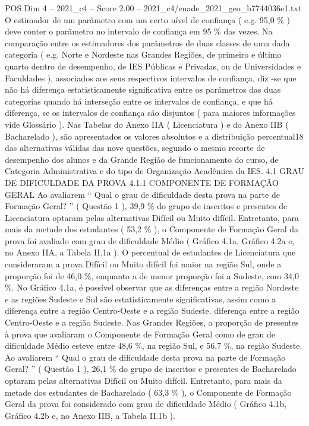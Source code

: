 \begin{textsample}{POS Dim 4 – 2021\_c4 – Score 2.00 – 2021\_c4/enade\_2021\_geo\_b7744036e1.txt}
O estimador de um parâmetro com um certo nível de confiança ( e.g. 95,0 \% ) deve conter o parâmetro no intervalo de confiança em 95 \% das vezes.
Na comparação entre os estimadores dos parâmetros de duas classes de uma dada categoria ( e.g.
Norte e Nordeste nas Grandes Regiões, de primeiro e último quarto dentro de desempenho, de IES Públicas e Privadas, ou de Universidades e Faculdades ), associados aos seus respectivos intervalos de confiança, diz -se que não há diferença estatisticamente significativa entre os parâmetros das duas categorias quando há interseção entre os intervalos de confiança, e que há diferença, se os intervalos de confiança são disjuntos ( para maiores informações vide Glossário ).
Nas Tabelas do Anexo IIA ( Licenciatura ) e do Anexo IIB ( Bacharelado ), são apresentados os valores absolutos e a distribuição percentual18 das alternativas válidas das nove questões, segundo o mesmo recorte de desempenho dos alunos e da Grande Região de funcionamento do curso, de Categoria Administrativa e do tipo de Organização Acadêmica da IES. 4.1 GRAU DE DIFICULDADE DA PROVA 4.1.1 COMPONENTE DE FORMAÇÃO GERAL Ao avaliarem “ Qual o grau de dificuldade desta prova na parte de Formação Geral? ” ( Questão 1 ), 39,9 \% do grupo de inscritos e presentes de Licenciatura optaram pelas alternativas Difícil ou Muito difícil.
Entretanto, para mais da metade dos estudantes ( 53,2 \% ), o Componente de Formação Geral da prova foi avaliado com grau de dificuldade Médio ( Gráfico 4.1a, Gráfico 4.2a e, no Anexo IIA, a Tabela II.1a ).
O percentual de estudantes de Licenciatura que consideraram a prova Difícil ou Muito difícil foi maior na região Sul, onde a proporção foi de 46,0 \%, enquanto a de menor proporção foi a Sudeste, com 34,0 \%.
No Gráfico 4.1a, é possível observar que as diferenças entre a região Nordeste e as regiões Sudeste e Sul são estatisticamente significativas, assim como a diferença entre a região Centro-Oeste e a região Sudeste. diferença entre a região Centro-Oeste e a região Sudeste.
Nas Grandes Regiões, a proporção de presentes à prova que avaliaram o Componente de Formação Geral como de grau de dificuldade Médio esteve entre 48,6 \%, na região Sul, e 56,7 \%, na região Sudeste.
Ao avaliarem “ Qual o grau de dificuldade desta prova na parte de Formação Geral? ” ( Questão 1 ), 26,1 \% do grupo de inscritos e presentes de Bacharelado optaram pelas alternativas Difícil ou Muito difícil.
Entretanto, para mais da metade dos estudantes de Bacharelado ( 63,3 \% ), o Componente de Formação Geral da prova foi considerado com grau de dificuldade Médio ( Gráfico 4.1b, Gráfico 4.2b e, no Anexo IIB, a Tabela II.1b ).

\end{textsample}
